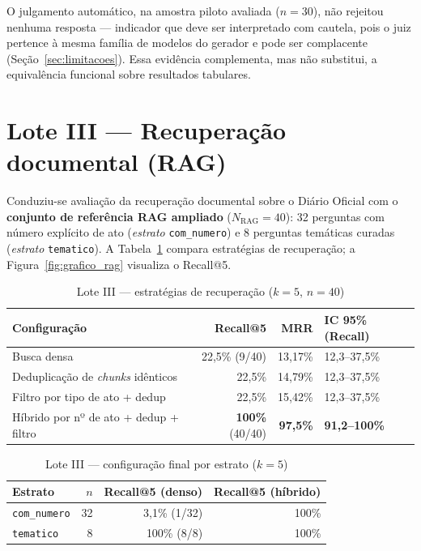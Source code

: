 O julgamento automático, na amostra piloto avaliada ($n=30$), não rejeitou nenhuma resposta --- indicador que deve ser interpretado com cautela, pois o juiz pertence à mesma família de modelos do gerador e pode ser complacente (Seção~\ref{sec:limitacoes}). Essa evidência complementa, mas não substitui, a equivalência funcional sobre resultados tabulares.

\section{Lote III --- Recuperação documental (RAG)}

Conduziu-se avaliação da recuperação documental sobre o Diário Oficial com o \textbf{conjunto de referência RAG ampliado} ($N_{\text{RAG}} = 40$): 32 perguntas com número explícito de ato (\textit{estrato} \texttt{com\_numero}) e 8 perguntas temáticas curadas (\textit{estrato} \texttt{tematico}). A Tabela~\ref{tab:rag} compara estratégias de recuperação; a Figura~\ref{fig:grafico_rag} visualiza o Recall@5.

\begin{table}[htbp]
\centering
\caption{Lote III --- estratégias de recuperação ($k=5$, $n=40$)}
\label{tab:rag}
\begin{tabular}{lrrl}
\toprule
\textbf{Configuração} & \textbf{Recall@5} & \textbf{MRR} & \textbf{IC 95\% (Recall)} \\
\midrule
Busca densa & 22,5\% (9/40) & 13,17\% & 12,3--37,5\% \\
Deduplicação de \textit{chunks} idênticos & 22,5\% & 14,79\% & 12,3--37,5\% \\
Filtro por tipo de ato + dedup & 22,5\% & 15,42\% & 12,3--37,5\% \\
Híbrido por nº de ato + dedup + filtro & \textbf{100\%} (40/40) & \textbf{97,5\%} & \textbf{91,2--100\%} \\
\bottomrule
\end{tabular}
\end{table}



\begin{table}[htbp]
\centering
\caption{Lote III --- configuração final por estrato ($k=5$)}
\label{tab:rag_estrato}
\begin{tabular}{lrrr}
\toprule
\textbf{Estrato} & \textbf{$n$} & \textbf{Recall@5 (denso)} & \textbf{Recall@5 (híbrido)} \\
\midrule
\texttt{com\_numero} & 32 & 3,1\% (1/32) & 100\% \\
\texttt{tematico} & 8 & 100\% (8/8) & 100\% \\
\bottomrule
\end{tabular}
\end{table}


